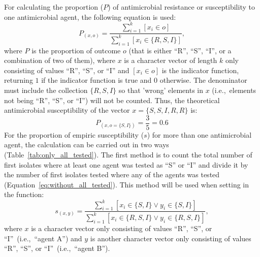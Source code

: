 \documentclass[article, shortnames]{jss}
\newcommand{\fct}[1]{\code{#1()}}
\begin{document}
For calculating the proportion ($P$) of antimicrobial resistance or
susceptibility to one antimicrobial agent, the following equation is used:
%
\begin{equation}
\label{eq:proportion}
P_{(x, o)} = \frac{
\sum_{i=1}^k [x_i \in o]
}{
\sum_{i=1}^k [x_i \in \{R,S,I\}]
},
\end{equation}
%
where $P$ is the proportion of outcome $o$ (that is either ``R'', ``S'',
``I'', or a combination of two of them), where $x$ is a character vector of
length $k$ only consisting of values ``R'', ``S'', or ``I'' and $[x_i \in
o]$ is the indicator function, returning $1$ if the indicator function is
true and $0$ otherwise.  The denominator must include the collection $\{R,
S, I\}$ so that ’wrong’ elements in $x$ (i.e.,~elements not being ``R'',
``S'', or ``I'') will not be counted.  Thus, the theoretical antimicrobial
susceptibility of the vector $x = \{S, S, I, R, R\}$ is:
%
\begin{equation*}
\label{eq:proportion_calc}
P_{(x, o = \{S, I\})} = \frac{3}{5} = 0.6
\end{equation*}
%
For the proportion of empiric susceptibility ($s$) for more than one
antimicrobial agent, the calculation can be carried out in two ways
(Table~\ref{tab:only_all_tested}).  The first method is to count the total
number of first isolates where at least one agent was tested as ``S'' or
``I'' and divide it by the number of first isolates tested where any of the
agents was tested (Equation~\ref{eq:without_all_tested}).  This method will
be used when setting  in the
\fct{susceptibility} function:
%
\begin{equation}
\label{eq:without_all_tested}
s_{(x, y)} = \frac{
\sum_{i=1}^k [x_i \in \{S,I\} \lor y_i \in \{S,I\}]
}{
\sum_{i=1}^k [x_i \in \{R,S,I\} \lor y_i \in \{R,S,I\}]
},
\end{equation}
%
where $x$ is a character vector only consisting of values ``R'', ``S'', or
``I''~(i.e.,~``agent A'') and $y$ is another character vector only consisting
of values ``R'', ``S'', or ``I''~(i.e.,~``agent B'').
\end{document}

